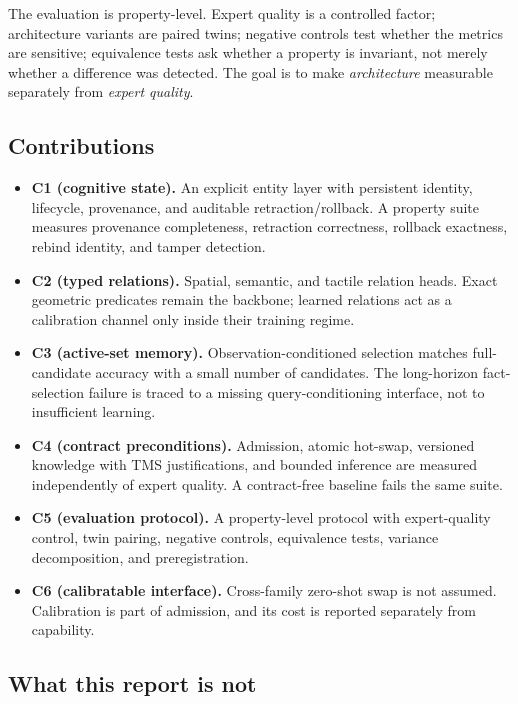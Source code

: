 \documentclass[10pt]{article}
\begin{document}
The evaluation is property-level. Expert quality is a controlled factor;
architecture variants are paired twins; negative controls test whether the
metrics are sensitive; equivalence tests ask whether a property is invariant,
not merely whether a difference was detected. The goal is to make
\emph{architecture} measurable separately from \emph{expert quality}.

\subsection{Contributions}

\begin{itemize}[leftmargin=*]
  \item \textbf{C1 (cognitive state).} An explicit entity layer with persistent
        identity, lifecycle, provenance, and auditable retraction/rollback. A
        property suite measures provenance completeness, retraction correctness,
        rollback exactness, rebind identity, and tamper detection.
  \item \textbf{C2 (typed relations).} Spatial, semantic, and tactile relation
        heads. Exact geometric predicates remain the backbone; learned
        relations act as a calibration channel only inside their training
        regime.
  \item \textbf{C3 (active-set memory).} Observation-conditioned selection
        matches full-candidate accuracy with a small number of candidates. The
        long-horizon fact-selection failure is traced to a missing
        query-conditioning interface, not to insufficient learning.
  \item \textbf{C4 (contract preconditions).} Admission, atomic hot-swap,
        versioned knowledge with TMS justifications, and bounded inference are
        measured independently of expert quality. A contract-free baseline fails
        the same suite.
  \item \textbf{C5 (evaluation protocol).} A property-level protocol with
        expert-quality control, twin pairing, negative controls, equivalence
        tests, variance decomposition, and preregistration.
  \item \textbf{C6 (calibratable interface).} Cross-family zero-shot swap is not
        assumed. Calibration is part of admission, and its cost is reported
        separately from capability.
\end{itemize}

\subsection{What this report is not}
\end{document}
